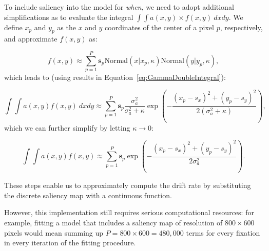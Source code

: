 \documentclass{article}
\begin{document}
To include saliency into the model for \textit{when}, we need to adopt additional simplifications as to evaluate the integral $\int \int a(x, y) \times f(x, y)~dxdy$. We define $x_p$ and $y_p$ as the $x$ and $y$ coordinates of the center of a pixel $p$, respectively, and approximate $f(x, y)$ as:

\begin{equation}
    f(x, y) \approx \sum_{p=1}^P \mathbf{s}_{p} \text{Normal}(x | x_p, \kappa)\text{Normal}(y | y_p, \kappa),
\end{equation}
which leads to (using results in Equation~\ref{eq:GammaDoubleIntegral}):

\begin{equation}
    \int \int a(x, y)f(x, y)~dx dy\approx \sum_{p=1}^P \mathbf{s}_{p} \frac{\sigma_a^2}{\sigma_a^2 + \kappa } \exp\left(-\frac{(x_p - s_x)^2+(y_p - s_y)^2}{2(\sigma_a^2 + \kappa)}\right),
\end{equation}
which we can further simplify by letting $\kappa \rightarrow 0$:

\begin{equation}
    \int \int a(x, y)f(x, y) \approx \sum_{p=1}^P \mathbf{s}_{p} \exp\left(-\frac{(x_p - s_x)^2+(y_p - s_y)^2}{2\sigma_a^2}\right).
\end{equation}

These steps enable us to approximately compute the drift rate by substituting the discrete saliency map with a continuous function.

However, this implementation still requires serious computational resources: for example, fitting a model that includes a saliency map of resolution of $800\times600$ pixels would mean summing up $P = 800\times600 = 480,000$ terms for every fixation in every iteration of the fitting procedure.
\end{document}
